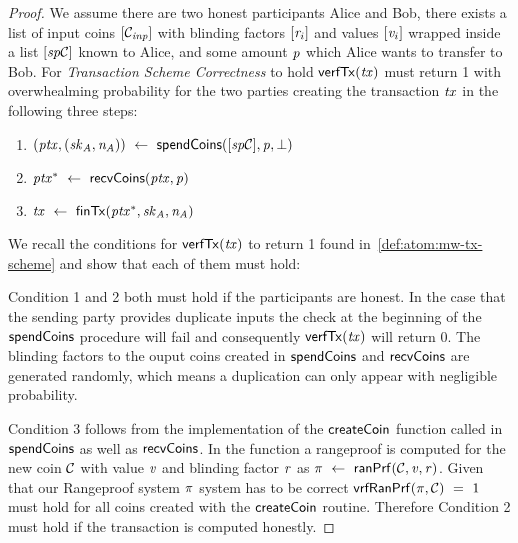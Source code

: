 \begin{proof}
    We assume there are two honest participants Alice and Bob, there exists a list of input coins $[\mathcal{C}_{\mathit{inp}}]$ with blinding factors $[\mathit{r}_i]$ and values $[\mathit{v}_i]$ wrapped inside a list $[\mathit{sp}\mathcal{C}]$ known to Alice, and some amount $\mathit{p}$ which Alice wants to transfer to Bob.
    For \emph{Transaction Scheme Correctness} to hold $\mathsf{verfTx}(\mathit{tx})$ must return 1 with overwhealming probability for the two parties creating the transaction $\mathit{tx}$ in the following three steps:
    \begin{enumerate}
        \item $(\mathit{ptx}, (\mathit{sk}_{\mathit{A}}, \mathit{\mathit{n}_{\mathit{A}}})) ~\leftarrow~ \mathsf{spendCoins}([\mathit{sp}\mathcal{C}],\mathit{p},\bot)$
        \item $\mathit{ptx}^* ~\leftarrow~ \mathsf{recvCoins}(\mathit{ptx},\mathit{p})$
        \item $\mathit{tx} ~\leftarrow~ \mathsf{finTx}(\mathit{ptx}^*,\mathit{sk}_{\mathit{A}},\mathit{\mathit{n}_{\mathit{A}}})$
    \end{enumerate}
    We recall the conditions for $\mathsf{verfTx}(\mathit{tx})$ to return 1 found in~\ref{def:atom:mw-tx-scheme} and show that each of them must hold:

    Condition 1 and 2 both must hold if the participants are honest.
    In the case that the sending party provides duplicate inputs the check at the beginning of the $\mathsf{spendCoins}$ procedure will fail and consequently $\mathsf{verfTx}(\mathit{tx})$ will return 0.
    The blinding factors to the ouput coins created in $\mathsf{spendCoins}$ and $\mathsf{recvCoins}$ are generated randomly, which means a duplication can only appear with negligible probability.

    Condition 3 follows from the implementation of the $\mathsf{createCoin}$ function called in $\mathsf{spendCoins}$ as well as $\mathsf{recvCoins}$.
    In the function a rangeproof is computed for the new coin $\mathcal{C}$ with value $\mathit{v}$ and blinding factor $\mathit{r}$ as $\pi ~\leftarrow~ \mathsf{ranPrf}(\mathcal{C},\mathit{v},\mathit{r})$.
    Given that our Rangeproof system $\pi$ system has to be correct $\mathsf{vrfRanPrf}(\pi,\mathcal{C}) ~=~ 1$ must hold for all coins created with the $\mathsf{createCoin}$ routine.
    Therefore Condition 2 must hold if the transaction is computed honestly.



\end{proof}
